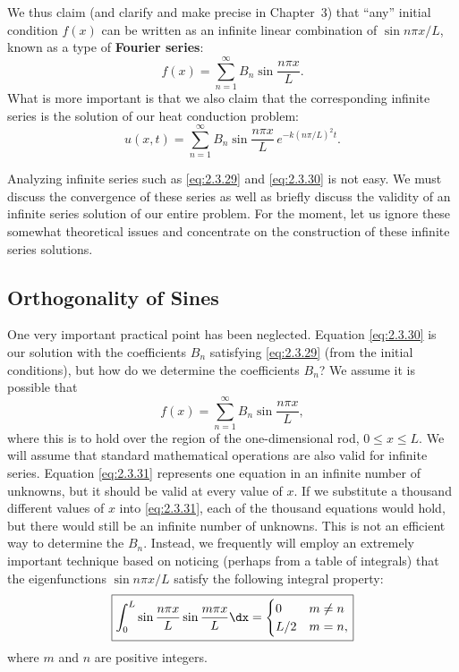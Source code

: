We thus claim (and clarify and make precise in Chapter~3) that ``any'' initial condition $f(x)$ can be written as an infinite linear combination of $\sin n\pi x/L$, known as a type of \textbf{Fourier series}:
\begin{equation}
\label{eq:2.3.29}
f(x) = \sum_{n=1}^{\infty} B_n \sin\frac{n\pi x}{L}.
\end{equation}
What is more important is that we also claim that the corresponding infinite series is the solution of our heat conduction problem:
\begin{equation}
\label{eq:2.3.30}
\boxed{u(x,t) = \sum_{n=1}^{\infty} B_n \sin\frac{n\pi x}{L}\,e^{-k(n\pi/L)^2 t}.}
\end{equation}

Analyzing infinite series such as \eqref{eq:2.3.29} and \eqref{eq:2.3.30} is not easy. We must discuss the convergence of these series as well as briefly discuss the validity of an infinite series solution of our entire problem. For the moment, let us ignore these somewhat theoretical issues and concentrate on the construction of these infinite series solutions.

\subsection{Orthogonality of Sines}
\label{sec:2.3.6}

One very important practical point has been neglected. Equation \eqref{eq:2.3.30} is our solution with the coefficients $B_n$ satisfying \eqref{eq:2.3.29} (from the initial conditions), but how do we determine the coefficients $B_n$? We assume it is possible that
\begin{equation}
\label{eq:2.3.31}
\boxed{f(x) = \sum_{n=1}^{\infty} B_n \sin\frac{n\pi x}{L},}
\end{equation}
where this is to hold over the region of the one-dimensional rod, $0 \le x \le L$. We will assume that standard mathematical operations are also valid for infinite series. Equation \eqref{eq:2.3.31} represents one equation in an infinite number of unknowns, but it should be valid at every value of $x$. If we substitute a thousand different values of $x$ into \eqref{eq:2.3.31}, each of the thousand equations would hold, but there would still be an infinite number of unknowns. This is not an efficient way to determine the $B_n$. Instead, we frequently will employ an extremely important technique based on noticing (perhaps from a table of integrals) that the eigenfunctions $\sin n\pi x/L$ satisfy the following integral property:
\begin{equation}
\label{eq:2.3.32}
\boxed{\int_0^L \sin\frac{n\pi x}{L}\sin\frac{m\pi x}{L}\dx = \begin{cases} 0 & m \ne n \\ L/2 & m = n, \end{cases}}
\end{equation}
where $m$ and $n$ are positive integers.

